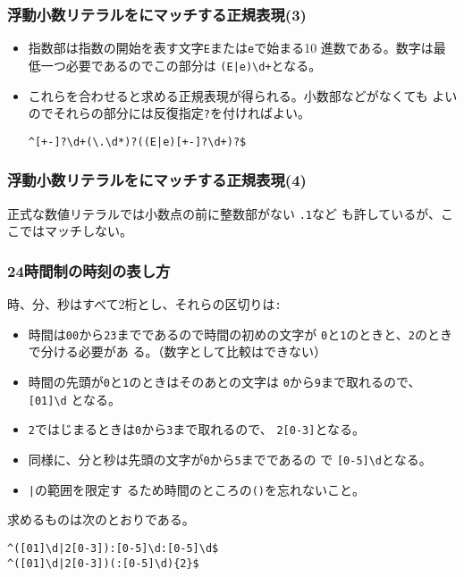 \begin{frame}[containsverbatim]
  \frametitle{浮動小数リテラルをにマッチする正規表現(3)}
\begin{itemize}
\item 指数部は指数の開始を表す文字\texttt{E}または\texttt{e}で始まる10
       進数である。数字は最低一つ必要であるのでこの部分は
       \texttt{(E|e)\textbackslash d+}となる。
 \item これらを合わせると求める正規表現が得られる。小数部などがなくても
       よいのでそれらの部分には反復指定\texttt{?}を付ければよい。
 {\Large
\begin{Verbatim}
^[+-]?\d+(\.\d*)?((E|e)[+-]?\d+)?$
\end{Verbatim}
}
\end{itemize}
\end{frame}
\begin{frame}[containsverbatim]
  \frametitle{浮動小数リテラルをにマッチする正規表現(4)}
正式な数値リテラルでは小数点の前に整数部がない \texttt{.1}など
       も許しているが、ここではマッチしない。
\end{frame}
\begin{frame}[containsverbatim]
 \frametitle{24時間制の時刻の表し方}
時、分、秒はすべて2桁とし、それらの区切りは\texttt{:}
\begin{itemize}
 \item 時間は\texttt{00}から\texttt{23}までであるので時間の初めの文字が
       \texttt{0}と\texttt{1}のときと、\texttt{2}のときで分ける必要があ
       る。（数字として比較はできない）
 \item 時間の先頭が\texttt{0}と\texttt{1}のときはそのあとの文字は
       \texttt{0}から\texttt{9}まで取れるので、
       \texttt{[01]\textbackslash d} となる。
 \item \texttt{2}ではじまるときは\texttt{0}から\texttt{3}まで取れるので、
\texttt{2[0-3]}となる。
 \item 同様に、分と秒は先頭の文字が\texttt{0}から\texttt{5}までであるの
       で \texttt{[0-5]\textbackslash d}となる。
 \item \texttt{|}の範囲を限定す
			 るため時間のところの\texttt{()}を忘れないこと。
\end{itemize}
求めるものは次のとおりである。
{\Large
\begin{Verbatim}
^([01]\d|2[0-3]):[0-5]\d:[0-5]\d$
^([01]\d|2[0-3])(:[0-5]\d){2}$
\end{Verbatim}
}
 \end{frame}
